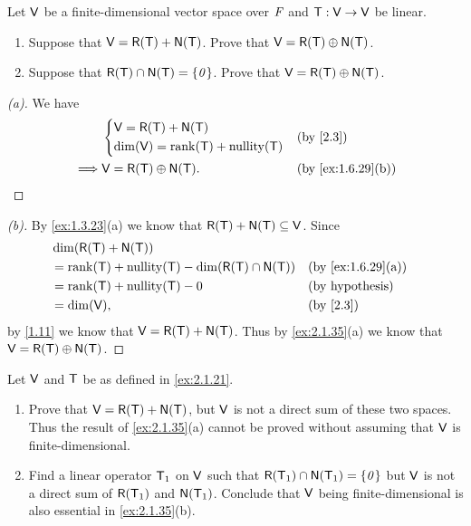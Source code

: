 \begin{ex}\label{ex:2.1.35}
  Let \(\mathsf{V}\) be a finite-dimensional vector space over \(\mathit{F}\) and \(\mathsf{T} : \mathsf{V} \to \mathsf{V}\) be linear.
  \begin{enumerate}
    \item Suppose that \(\V = \rg{\T} + \ns{\T}\).
          Prove that \(\V = \rg{\T} \oplus \ns{\T}\).
    \item Suppose that \(\rg{\T} \cap \ns{\T} = \set{\zv}\).
          Prove that \(\V = \rg{\T} \oplus \ns{\T}\).
  \end{enumerate}
\end{ex}

\begin{proof}[(a)]
  We have
  \begin{align*}
             & \begin{dcases}
                 \V = \rg{\T} + \ns{\T} \\
                 \dim(\V) = \rk{\T} + \nt{\T}
               \end{dcases} &  & \text{(by \cref{2.3})}                          \\
    \implies & \V = \rg{\T} \oplus \ns{\T}. &  & \text{(by \cref{ex:1.6.29}(b))}
  \end{align*}
\end{proof}

\begin{proof}[(b)]
  By \cref{ex:1.3.23}(a) we know that \(\rg{\T} + \ns{\T} \subseteq \V\).
  Since
  \begin{align*}
     & \dim(\rg{\T} + \ns{\T})                                                               \\
     & = \rk{\T} + \nt{\T} - \dim(\rg{\T} \cap \ns{\T}) &  & \text{(by \cref{ex:1.6.29}(a))} \\
     & = \rk{\T} + \nt{\T} - 0                          &  & \text{(by hypothesis)}          \\
     & = \dim(\V),                                      &  & \text{(by \cref{2.3})}
  \end{align*}
  by \cref{1.11} we know that \(\V = \rg{\T} + \ns{\T}\).
  Thus by \cref{ex:2.1.35}(a) we know that \(\V = \rg{\T} \oplus \ns{\T}\).
\end{proof}

\begin{ex}\label{ex:2.1.36}
  Let \(\mathsf{V}\) and \(\mathsf{T}\) be as defined in \cref{ex:2.1.21}.
  \begin{enumerate}
    \item Prove that \(\V = \rg{\T} + \ns{\T}\), but \(\mathsf{V}\) is not a direct sum of these two spaces.
          Thus the result of \cref{ex:2.1.35}(a) cannot be proved without assuming that \(\mathsf{V}\) is finite-dimensional.
    \item Find a linear operator \(\mathsf{T}_1\) on \(\mathsf{V}\) such that \(\rg{\T_1} \cap \ns{\T_1} = \set{\zv}\) but \(\mathsf{V}\) is not a direct sum of \(\rg{\T_1}\) and \(\ns{\T_1}\).
          Conclude that \(\mathsf{V}\) being finite-dimensional is also essential in \cref{ex:2.1.35}(b).
  \end{enumerate}
\end{ex}

